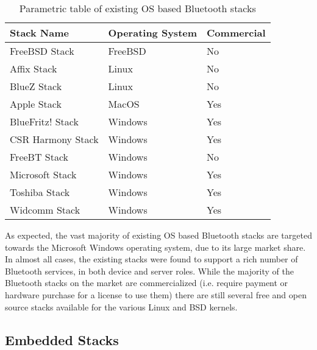 \begin{table}[H]
	\begin{center}
		\begin{tabular}{ | l | l | l |}
			\hline
			\textbf{Stack Name}	& \textbf{Operating System}	& \textbf{Commercial} \\ \hline

			FreeBSD Stack		& FreeBSD	& No	\\ \hline
			Affix Stack			& Linux		& No	\\ \hline
			BlueZ Stack			& Linux		& No	\\ \hline
			Apple Stack			& MacOS		& Yes	\\ \hline
			BlueFritz! Stack	& Windows	& Yes	\\ \hline
			CSR Harmony Stack	& Windows	& Yes	\\ \hline
			FreeBT Stack 		& Windows	& No	\\ \hline
			Microsoft Stack		& Windows	& Yes	\\ \hline
			Toshiba Stack		& Windows	& Yes	\\ \hline
			Widcomm Stack		& Windows	& Yes	\\ \hline
		\end{tabular}
		\caption[Existing Operating System Bluetooth Stacks]{Parametric table of existing OS based Bluetooth stacks}
		\label{tab:osbtstacks}
	\end{center}
\end{table}


As expected, the vast majority of existing OS based Bluetooth stacks are targeted towards the Microsoft Windows operating system, due to its large market share. In almost all cases, the existing stacks were found to support a rich number of Bluetooth services, in both device and server roles. While the majority of the Bluetooth stacks on the market are commercialized (i.e. require payment or hardware purchase for a license to use them) there are still several free and open source stacks available for the various Linux and BSD kernels.


\subsection{Embedded Stacks}


